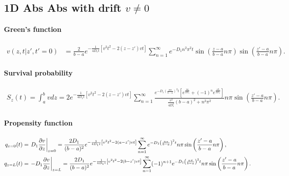 
\subsection{1D Abs Abs with drift $v\neq 0$}

\paragraph{Green's function}
\begin{align}
  v(z,t|z',t'=0) &= \frac{2}{b-a}e^{-\frac{1}{4D_1t}\left[v^2t^2 - 2(z-z')vt \right]}
  \sum_{n=1}^{\infty}
  e^{-D_1n^2\pi^2 t} \sin\left(\frac{z-a}{b-a}n\pi\right) \sin\left(\frac{z'-a}{b-a}n\pi\right).
\end{align}

\paragraph{Survival probability}
\begin{align}
  S_z(t) = \int_a^b vdz
  = 2e^{-\frac{1}{4D_1t}\left[ v^2t^2 - 2(z-z')vt \right]}
    \sum_{n=1}^{\infty} \frac{ e^{-D_1\left(\frac{n\pi}{b-a}\right)^2 t} \left[ e^{\frac{va}{2D_1}} + (-1)^ne^{\frac{vb}{2D_1}}\right] }{ \frac{v^2}{4D_1^2}(b-a)^2 + n^2\pi^2 }
    n\pi \sin\left(\frac{z'-a}{b-a}n\pi \right).
\end{align}

\paragraph{Propensity function}
\begin{align}
  q_{z=0}(t) &= \left.D_1 \frac{\partial v}{\partial z}\right|_{z=0} = \frac{2 D_1}{(b-a)^2} e^{-\frac{1}{4D_1 t}\left[ v^2t^2 - 2(a-z')vt \right]}
  \sum_{n=1}^{\infty} e^{-D_1\left(\frac{n\pi}{b-a}\right)^2 t} n\pi \sin\left(\frac{z'-a}{b-a}n\pi\right),\\
  q_{z=L}(t) &= \left.- D_1 \frac{\partial v}{\partial z}\right|_{z=L} = \frac{2 D_1}{(b-a)^2} e^{-\frac{1}{4D_1 t}\left[ v^2t^2 - 2(b-z')vt \right]}
  \sum_{n=1}^{\infty} (-1)^{n+1} e^{-D_1\left(\frac{n\pi}{b-a}\right)^2 t} n\pi \sin\left(\frac{z'-a}{b-a}n\pi\right).
\end{align}

